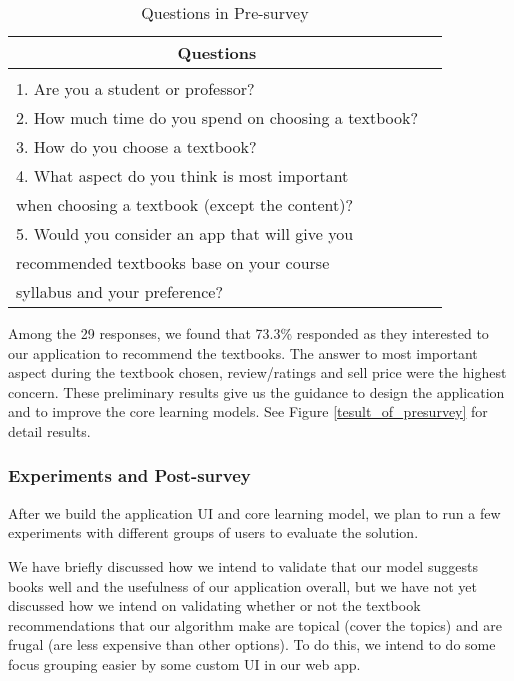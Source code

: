 \begin{table}[ht] 
\caption{Questions in Pre-survey}
\label{Pre-survey}
\begin{center}
\begin{tabular}{ll}
\multicolumn{1}{c}{\bf Questions} 
\\ \hline \\
1. Are you a student or professor?\\
2. How much time do you spend on choosing a textbook?\\
3. How do you choose a textbook?\\
4. What aspect do you think is most important\\
when choosing a textbook (except the content)? \\
5. Would you consider an app that will give you \\
recommended textbooks base on your course \\
syllabus and your preference? \\
\end{tabular}
\end{center}
\end{table}
Among the 29 responses, we found that 73.3\% responded as they interested to our application to recommend the textbooks. The answer to most important aspect during the textbook chosen, review/ratings and sell price were the highest concern. These preliminary results give us the guidance to design the application and to improve the core learning models. See Figure \ref{tesult_of_presurvey} for detail results.

	\subsubsection{Experiments and Post-survey}
After we build the application UI and core learning model, we plan to run a few experiments with different groups of users to evaluate the solution.

We have briefly discussed how we intend to validate that our model suggests books well and the usefulness of our application overall, but we have not yet discussed how we intend on validating whether or not the textbook recommendations that our algorithm make are topical (cover the topics) and are frugal (are less expensive than other options).  
To do this, we intend to do some focus grouping easier by some custom UI in our web app.

